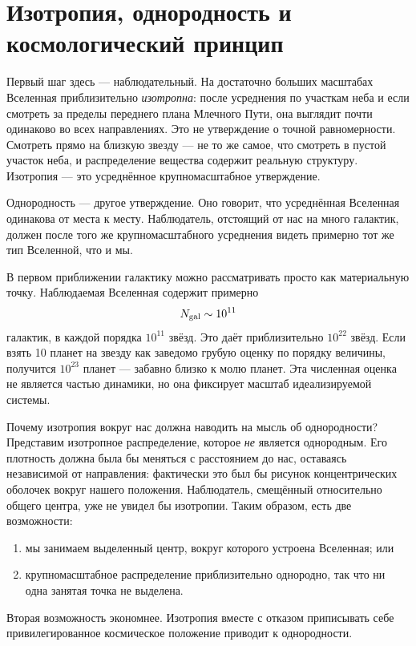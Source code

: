 \section{Изотропия, однородность и космологический принцип}

Первый шаг здесь — наблюдательный. На достаточно больших масштабах Вселенная приблизительно \emph{изотропна}: после усреднения по участкам неба и если смотреть за пределы переднего плана Млечного Пути, она выглядит почти одинаково во всех направлениях. Это не утверждение о точной равномерности. Смотреть прямо на близкую звезду — не то же самое, что смотреть в пустой участок неба, и распределение вещества содержит реальную структуру. Изотропия — это усреднённое крупномасштабное утверждение.

Однородность — другое утверждение. Оно говорит, что усреднённая Вселенная одинакова от места к месту. Наблюдатель, отстоящий от нас на много галактик, должен после того же крупномасштабного усреднения видеть примерно тот же тип Вселенной, что и мы.

В первом приближении галактику можно рассматривать просто как материальную точку. Наблюдаемая Вселенная содержит примерно
\begin{equation}
N_{\rm gal}\sim 10^{11}
\end{equation}
галактик, в каждой порядка \(10^{11}\) звёзд. Это даёт приблизительно \(10^{22}\) звёзд. Если взять 10 планет на звезду как заведомо грубую оценку по порядку величины, получится \(10^{23}\) планет — забавно близко к молю планет. Эта численная оценка не является частью динамики, но она фиксирует масштаб идеализируемой системы.

\begin{classroomqa}
\end{classroomqa}

Почему изотропия вокруг нас должна наводить на мысль об однородности? Представим изотропное распределение, которое \emph{не} является однородным. Его плотность должна была бы меняться с расстоянием до нас, оставаясь независимой от направления: фактически это был бы рисунок концентрических оболочек вокруг нашего положения. Наблюдатель, смещённый относительно общего центра, уже не увидел бы изотропии. Таким образом, есть две возможности:
\begin{enumerate}
\item мы занимаем выделенный центр, вокруг которого устроена Вселенная; или
\item крупномасштабное распределение приблизительно однородно, так что ни одна занятая точка не выделена.
\end{enumerate}
Вторая возможность экономнее. Изотропия вместе с отказом приписывать себе привилегированное космическое положение приводит к однородности.


